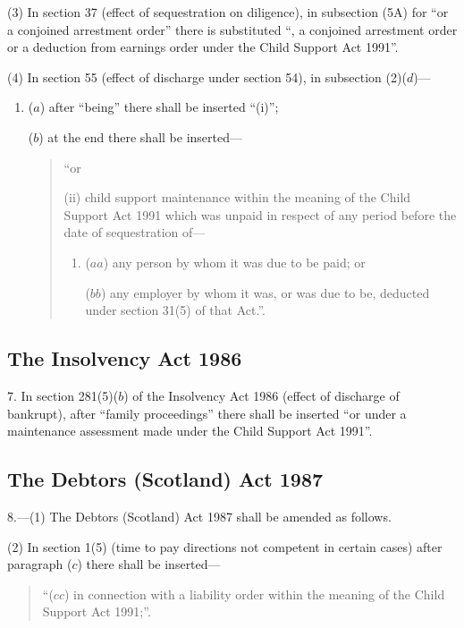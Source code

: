 \documentclass[12pt,a4paper]{article}
\begin{document}
(3) In section 37 (effect of sequestration on diligence), in subsection (5A) for “or a conjoined arrestment order” there is substituted “, a conjoined arrestment order or a deduction from earnings order under the Child Support Act 1991”.

(4) In section 55 (effect of discharge under section 54), in subsection (2)($d$)---
\begin{enumerate}\item[]
($a$) after “being” there shall be inserted “(i)”;

($b$) at the end there shall be inserted---
\begin{quotation}
 “or

(ii) child support maintenance within the meaning of the Child Support Act 1991 which was unpaid in respect of any period before the date of sequestration of---
\begin{enumerate}\item[]
($aa$) any person by whom it was due to be paid; or

($bb$) any employer by whom it was, or was due to be, deducted under section 31(5) of that Act.”.
\end{enumerate}
\end{quotation}
\end{enumerate}

\subsection*{The Insolvency Act 1986}

7. In section 281(5)($b$) of the Insolvency Act 1986 (effect of discharge of bankrupt), after “family proceedings” there shall be inserted “or under a maintenance assessment made under the Child Support Act 1991”.

\subsection*{The Debtors (Scotland) Act 1987}

8.---(1) The Debtors (Scotland) Act 1987 shall be amended as follows.

(2) In section 1(5) (time to pay directions not competent in certain cases) after paragraph ($c$) there shall be inserted---
\begin{quotation}
“($cc$) in connection with a liability order within the meaning of the Child Support Act 1991;”.
\end{quotation}
\end{document}
